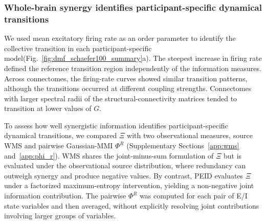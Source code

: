 \documentclass[fleqn,10pt]{wlscirep}
\theoremstyle{naturetheorem}
\begin{document}
\subsubsection*{Whole-brain synergy identifies participant-specific dynamical transitions}

We used mean excitatory firing rate as an order parameter to identify the collective transition in each participant-specific model(Fig.~\ref{fig:dmf_schaefer100_summary}a). The steepest increase in firing rate defined the reference transition region independently of the information measures. Across connectomes, the firing-rate curves showed similar transition patterns, although the transitions occurred at different coupling strengths. Connectomes with larger spectral radii of the structural-connectivity matrices tended to transition at lower values of $G$.



To assess how well synergistic information identifies participant-specific dynamical transitions, we compared $\Xi$ with two observational measures, source WMS and pairwise Gaussian-MMI $\Phi^R$ (Supplementary Sections~\ref{app:wms} and~\ref{app:phi_r}). WMS shares the joint-minus-sum formulation of $\Xi$ but is evaluated under the observational source distribution, where redundancy can outweigh synergy and produce negative values. By contrast, PEID evaluates $\Xi$ under a factorized maximum-entropy intervention, yielding a non-negative joint information contribution. The pairwise $\Phi^R$ was computed for each pair of E/I state variables and then averaged, without explicitly resolving joint contributions involving larger groups of variables.
\end{document}
